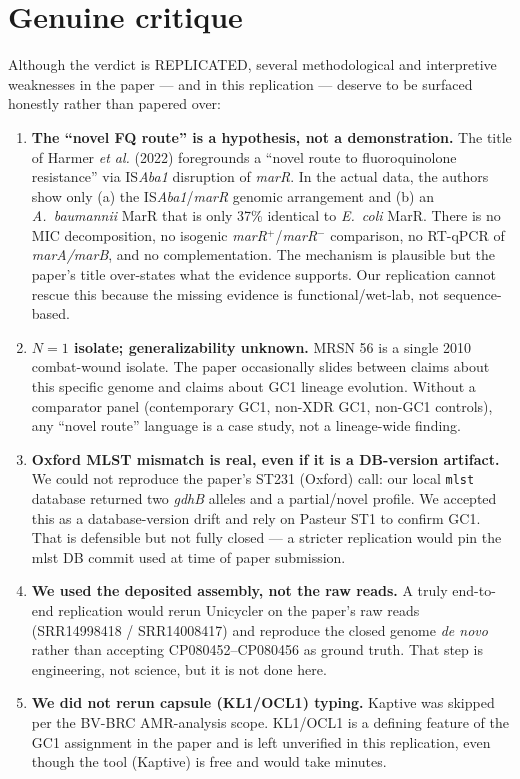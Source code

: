 \documentclass[11pt]{article}
\begin{document}
\section{Genuine critique}
Although the verdict is REPLICATED, several methodological and interpretive weaknesses in the paper --- and in this replication --- deserve to be surfaced honestly rather than papered over:

\begin{enumerate}[leftmargin=1.5em]
\item \textbf{The ``novel FQ route'' is a hypothesis, not a demonstration.} The title of Harmer \emph{et al.} (2022) foregrounds a ``novel route to fluoroquinolone resistance'' via IS\emph{Aba1} disruption of \emph{marR}. In the actual data, the authors show only (a) the IS\emph{Aba1}/\emph{marR} genomic arrangement and (b) an \emph{A.\ baumannii} MarR that is only 37\% identical to \emph{E.\ coli} MarR. There is no MIC decomposition, no isogenic \emph{marR}$^{+}$/\emph{marR}$^{-}$ comparison, no RT-qPCR of \emph{marA/marB}, and no complementation. The mechanism is plausible but the paper's title over-states what the evidence supports. Our replication cannot rescue this because the missing evidence is functional/wet-lab, not sequence-based.
\item \textbf{$N{=}1$ isolate; generalizability unknown.} MRSN 56 is a single 2010 combat-wound isolate. The paper occasionally slides between claims about this specific genome and claims about GC1 lineage evolution. Without a comparator panel (contemporary GC1, non-XDR GC1, non-GC1 controls), any ``novel route'' language is a case study, not a lineage-wide finding.
\item \textbf{Oxford MLST mismatch is real, even if it is a DB-version artifact.} We could not reproduce the paper's ST231 (Oxford) call: our local \texttt{mlst} database returned two \emph{gdhB} alleles and a partial/novel profile. We accepted this as a database-version drift and rely on Pasteur ST1 to confirm GC1. That is defensible but not fully closed --- a stricter replication would pin the mlst DB commit used at time of paper submission.
\item \textbf{We used the deposited assembly, not the raw reads.} A truly end-to-end replication would rerun Unicycler on the paper's raw reads (SRR14998418 / SRR14008417) and reproduce the closed genome \emph{de novo} rather than accepting CP080452--CP080456 as ground truth. That step is engineering, not science, but it is not done here.
\item \textbf{We did not rerun capsule (KL1/OCL1) typing.} Kaptive was skipped per the BV-BRC AMR-analysis scope. KL1/OCL1 is a defining feature of the GC1 assignment in the paper and is left unverified in this replication, even though the tool (Kaptive) is free and would take minutes.

\end{enumerate}
\end{document}
